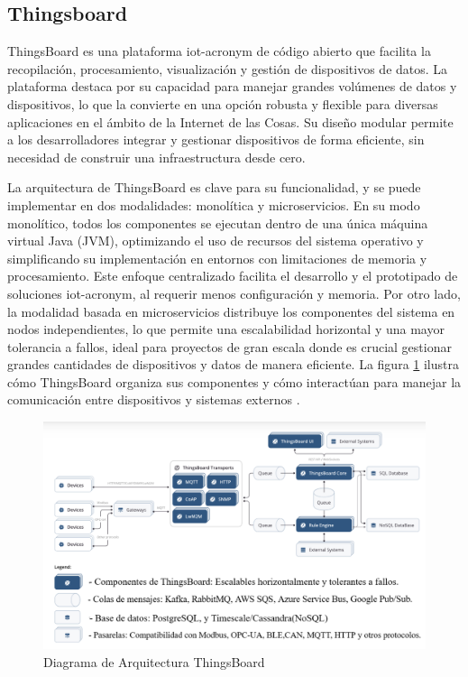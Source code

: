 \subsection{Thingsboard}
ThingsBoard es una plataforma \acrshort{iot-acronym} de código abierto que facilita la recopilación, procesamiento, visualización y  gestión de dispositivos de datos. La plataforma destaca por su capacidad para manejar grandes volúmenes de datos y dispositivos, lo que la convierte en una opción robusta y flexible para diversas aplicaciones en el ámbito de la Internet de las Cosas. Su diseño modular permite a los desarrolladores integrar y gestionar dispositivos de forma eficiente, sin necesidad de construir una infraestructura desde cero.

La arquitectura de ThingsBoard es clave para su funcionalidad, y se puede implementar en dos modalidades: monolítica y microservicios. En su modo monolítico, todos los componentes se ejecutan dentro de una única máquina virtual Java (JVM), optimizando el uso de recursos del sistema operativo y simplificando su implementación en entornos con limitaciones de memoria y procesamiento. Este enfoque centralizado facilita el desarrollo y el prototipado de soluciones \acrshort{iot-acronym}, al requerir menos configuración y memoria. Por otro lado, la modalidad basada en microservicios distribuye los componentes del sistema en nodos independientes, lo que permite una escalabilidad horizontal y una mayor tolerancia a fallos, ideal para proyectos de gran escala donde es crucial gestionar grandes cantidades de dispositivos y datos de manera eficiente. 
La figura \ref{fig:tbarqui} ilustra cómo ThingsBoard organiza sus componentes y cómo interactúan para manejar la comunicación entre dispositivos y sistemas externos \cite{ThingsBoard}.

\begin{figure}[H]
\leavevmode
\begin{minipage}{\textwidth}
\begin{center}
\includegraphics[width=1.0\textwidth]{./capitulo_03/figures/SW/tbarquitecture.png}
\caption{Diagrama de Arquitectura ThingsBoard\label{fig:tbarqui}}
\end{center}
\end{minipage}
\end{figure}

